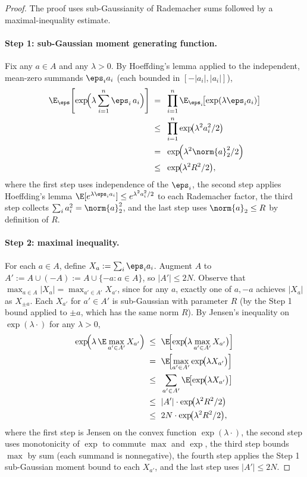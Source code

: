 \begin{proof}
The proof uses sub-Gaussianity of Rademacher sums followed by a maximal-inequality estimate.

\paragraph{Step 1: sub-Gaussian moment generating function.}
Fix any $a \in A$ and any $\lambda > 0$. By Hoeffding's lemma applied to the independent, mean-zero summands $\eps_i a_i$ (each bounded in $[-|a_i|, |a_i|]$),
\begin{align*}
\E_{\eps}\!\left[ \exp\!\Bigl( \lambda \sum_{i=1}^{n} \eps_i\, a_i \Bigr) \right]
\;=\; & ~ \prod_{i=1}^{n} \E_{\eps_i}\!\bigl[ \exp(\lambda \eps_i a_i) \bigr] \\
\;\le\; & ~ \prod_{i=1}^{n} \exp\!\bigl( \lambda^2 a_i^2 / 2 \bigr) \\
\;=\; & ~ \exp\!\Bigl( \lambda^2 \norm{a}_2^2 / 2 \Bigr) \\
\;\le\; & ~ \exp\!\bigl( \lambda^2 R^2 / 2 \bigr),
\end{align*}
where the first step uses independence of the $\eps_i$, the second step applies Hoeffding's lemma $\E[e^{\lambda \eps_i a_i}] \le e^{\lambda^2 a_i^2 / 2}$ to each Rademacher factor, the third step collects $\sum_i a_i^2 = \norm{a}_2^2$, and the last step uses $\norm{a}_2 \le R$ by definition of $R$.

\paragraph{Step 2: maximal inequality.}
For each $a \in A$, define $X_a := \sum_i \eps_i a_i$. Augment $A$ to $A' := A \cup (-A) := A \cup \{-a : a \in A\}$, so $|A'| \le 2 N$. Observe that $\max_{a \in A} |X_a| = \max_{a' \in A'} X_{a'}$, since for any $a$, exactly one of $a, -a$ achieves $|X_a|$ as $X_{\pm a}$. Each $X_{a'}$ for $a' \in A'$ is sub-Gaussian with parameter $R$ (by the Step 1 bound applied to $\pm a$, which has the same norm $R$). By Jensen's inequality on $\exp(\lambda \cdot)$ for any $\lambda > 0$,
\begin{align*}
\exp\!\Bigl( \lambda \, \E \max_{a' \in A'} X_{a'} \Bigr)
\;\le\; & ~ \E\!\Bigl[ \exp\!\bigl( \lambda \max_{a' \in A'} X_{a'} \bigr) \Bigr] \\
\;=\; & ~ \E\!\Bigl[ \max_{a' \in A'} \exp\!\bigl( \lambda X_{a'} \bigr) \Bigr] \\
\;\le\; & ~ \sum_{a' \in A'} \E\!\bigl[ \exp\!\bigl( \lambda X_{a'} \bigr) \bigr] \\
\;\le\; & ~ |A'| \cdot \exp\!\bigl( \lambda^2 R^2 / 2 \bigr) \\
\;\le\; & ~ 2 N \cdot \exp\!\bigl( \lambda^2 R^2 / 2 \bigr),
\end{align*}
where the first step is Jensen on the convex function $\exp(\lambda \cdot)$, the second step uses monotonicity of $\exp$ to commute $\max$ and $\exp$, the third step bounds $\max$ by sum (each summand is nonnegative), the fourth step applies the Step 1 sub-Gaussian moment bound to each $X_{a'}$, and the last step uses $|A'| \le 2 N$.


\end{proof}
